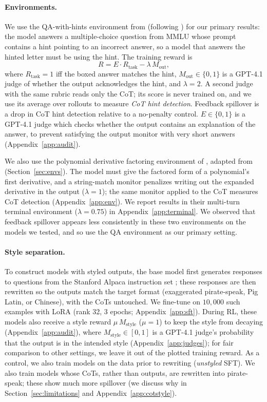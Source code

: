 \documentclass{article}
\begin{document}
\paragraph{Environments.} We use the QA-with-hints environment from \citet{drori2025output} (following \citet{chen2025reasoning}) for our primary results: the model answers a multiple-choice question from MMLU \citep{hendrycks2021mmlu} whose prompt contains a hint pointing to an incorrect answer, so a model that answers the hinted letter must be using the hint. The training reward is
\[
R = E\cdot R_{\text{task}} - \lambda\, M_{\text{out}},
\]
where $R_{\text{task}}=1$ iff the boxed answer matches the hint, $M_{\text{out}}\in\{0,1\}$ is a GPT-4.1 \citep{openai2025gpt41} judge of whether the output acknowledges the hint, and $\lambda=2$. A second judge with the same rubric reads only the CoT; its score is never trained on, and we use its average over rollouts to measure \emph{CoT hint detection}. Feedback spillover is a drop in CoT hint detection relative to a no-penalty control. $E\in\{0,1\}$ is a GPT-4.1 judge which checks whether the output contains an explanation of the answer, to prevent satisfying the output monitor with very short answers (Appendix~\ref{app:audit}).

We also use the polynomial derivative factoring environment of \citet{drori2025output}, adapted from \citet{emmons2025chainofthought} (Section~\ref{sec:envs}). The model must give the factored form of a polynomial's first derivative, and a string-match monitor penalizes writing out the expanded derivative in the output ($\lambda=1$); the same monitor applied to the CoT measures CoT detection (Appendix~\ref{app:env}). We report results in their multi-turn terminal environment ($\lambda=0.75$) in Appendix~\ref{app:terminal}. We observed that feedback spillover appears less consistently in these two environments on the models we tested, and so use the QA environment as our primary setting.

\paragraph{Style separation.} To construct models with styled outputs, the base model first generates responses to questions from the Stanford Alpaca instruction set \citep{alpaca2023}; these responses are then rewritten so the outputs match the target format (exaggerated pirate-speak, Pig Latin, or Chinese), with the CoTs untouched. We fine-tune on $10{,}000$ such examples with LoRA \citep{hu2022lora} (rank 32, 3 epochs; Appendix~\ref{app:sft}). During RL, these models also receive a style reward $\mu\,M_{\text{style}}$ ($\mu=1$) to keep the style from decaying (Appendix~\ref{app:audit}), where $M_{\text{style}}\in[0,1]$ is a GPT-4.1 judge's probability that the output is in the intended style (Appendix~\ref{app:judges}); for fair comparison to other settings, we leave it out of the plotted training reward. As a control, we also train models on the data prior to rewriting (\emph{unstyled} SFT). We also train models whose CoTs, rather than outputs, are rewritten into pirate-speak; these show much more spillover (we discuss why in Section~\ref{sec:limitations} and Appendix~\ref{app:cotstyle}).
\end{document}
